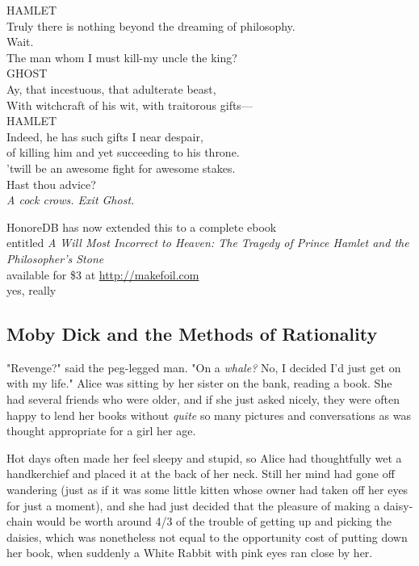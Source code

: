 \noindent{}HAMLET\\
Truly there is nothing beyond the dreaming of philosophy.\\
Wait.\\
The man whom I must kill-my uncle the king?\\

\noindent{}GHOST\\
Ay, that incestuous, that adulterate beast,\\
With witchcraft of his wit, with traitorous gifts---\\

\noindent{}HAMLET\\
Indeed, he has such gifts I near despair,\\
of killing him and yet succeeding to his throne.\\
'twill be an awesome fight for awesome stakes.\\
Hast thou advice?\\

\emph{A cock crows. Exit Ghost.}

\begin{center}
HonoreDB has now extended this to a complete ebook\\
entitled \emph{A Will Most Incorrect to Heaven: The Tragedy of Prince Hamlet and
the Philosopher's Stone}\\
available for \$3 at \url{http://makefoil.com}\\
yes, really
\end{center}
\sbreak%
\subsection{Moby Dick and the Methods of Rationality}
"Revenge?" said the peg-legged man. "On a \emph{whale?} No, I decided I'd just
get on with my life."
\sbreak%
Alice was sitting by her sister on the bank, reading a book. She had several
friends who were older, and if she just asked nicely, they were often happy to
lend her books without \emph{quite} so many pictures and conversations as was
thought appropriate for a girl her age.

Hot days often made her feel sleepy and stupid, so Alice had thoughtfully wet a
handkerchief and placed it at the back of her neck. Still her mind had gone off
wandering (just as if it was some little kitten whose owner had taken off her
eyes for just a moment), and she had just decided that the pleasure of making a
daisy-chain would be worth around 4/3 of the trouble of getting up and picking
the daisies, which was nonetheless not equal to the opportunity cost of putting
down her book, when suddenly a White Rabbit with pink eyes ran close by her.

